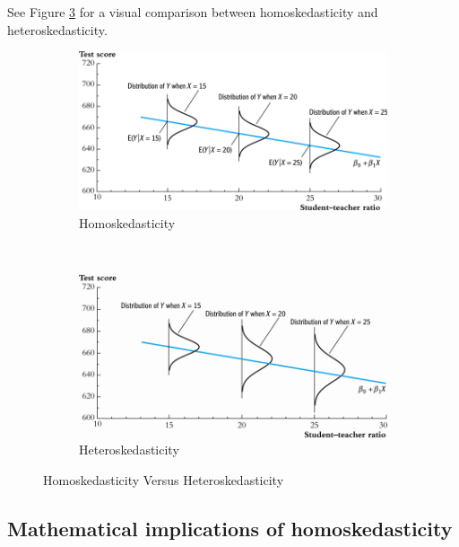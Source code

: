 \documentclass[a4paper,11pt]{article}
\begin{document}
See Figure \ref{fig:homovshetero} for a visual comparison between
homoskedasticity and heteroskedasticity. 

\begin{LaTeX}
\begin{figure}
    \centering
    \begin{subfigure}[!ht]{0.85\textwidth}
        \includegraphics[width=\textwidth]{./figure/fig-4-4}
        \caption{Homoskedasticity}
        \label{fig:homo1}
    \end{subfigure}
    ~ %
    \begin{subfigure}[!ht]{0.85\textwidth}
        \includegraphics[width=\textwidth]{./figure/fig-5-2}
        \caption{Heteroskedasticity}
        \label{fig:hetero1}
    \end{subfigure}
    \caption{Homoskedasticity Versus Heteroskedasticity}\label{fig:homovshetero}
\end{figure}
\end{LaTeX}

\subsection{Mathematical implications of homoskedasticity}
\label{sec:org581cf68}
\end{document}
